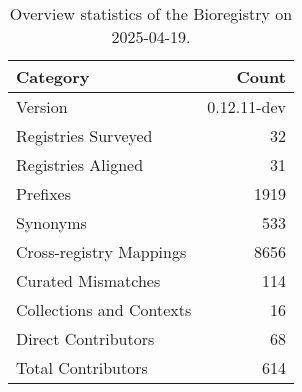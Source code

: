 \begin{table}
\caption{Overview statistics of the Bioregistry on 2025-04-19.}
\label{tab:bioregistry-summary}
\begin{tabular}{lr}
\toprule
Category & Count \\
\midrule
Version & 0.12.11-dev \\
Registries Surveyed & 32 \\
Registries Aligned & 31 \\
Prefixes & 1919 \\
Synonyms & 533 \\
Cross-registry Mappings & 8656 \\
Curated Mismatches & 114 \\
Collections and Contexts & 16 \\
Direct Contributors & 68 \\
Total Contributors & 614 \\
\bottomrule
\end{tabular}
\end{table}
